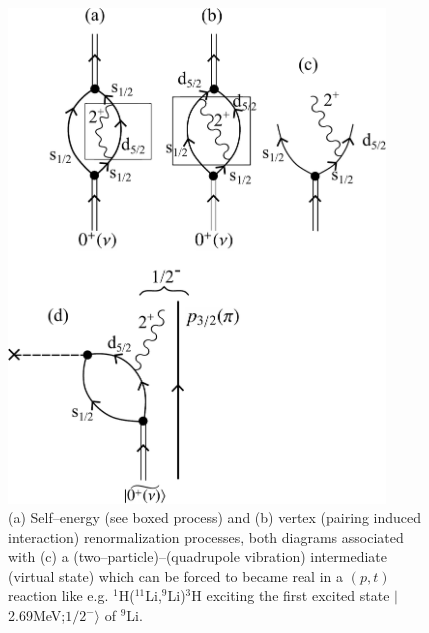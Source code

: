  \begin{figure}
\centerline{\includegraphics*[width=10cm,angle=0]{C6/figs_C6/fig6_4}}
\caption{(a) Self--energy (see boxed process) and (b) vertex (pairing induced interaction) renormalization processes, both diagrams associated with (c) a (two--particle)--(quadrupole vibration) intermediate (virtual state) which can be forced to became real in a $(p,t)$ reaction like e.g. $^1$H($^{11}$Li,$^9$Li)$^3$H exciting the first excited state $|$2.69MeV;$1/2^-\rangle$ of $^9$Li.}\label{fig6.1.5}
\end{figure}

